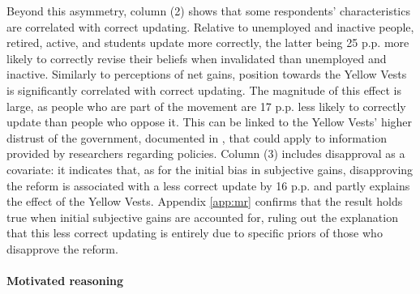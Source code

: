 \documentclass[12pt]{article} %
\begin{document}
Beyond this asymmetry, column (2) shows that some respondents' characteristics are correlated with correct updating. Relative to unemployed and inactive people, retired, active, and students update more correctly, the latter being 25 p.p. more likely to correctly revise their beliefs when invalidated than unemployed and inactive. Similarly to perceptions of net gains, position towards the Yellow Vests is significantly correlated with correct updating. The magnitude of this effect is large, as people who are part of the movement are 17 p.p. less likely to correctly update than people who oppose it. This can be linked to the Yellow Vests' higher distrust of the government, documented in \citet{algan_et_al_19}, that could apply to information provided by researchers regarding policies. Column (3) includes disapproval as a covariate: it indicates that, as for the initial bias in subjective gains, disapproving the reform is associated with a less correct update by 16 p.p. and partly explains the effect of the Yellow Vests. Appendix \ref{app:mr} confirms that the result holds true when initial subjective gains are accounted for, ruling out the explanation that this less correct updating is entirely due to specific priors of those who disapprove the reform. 

\paragraph{Motivated reasoning} %

\end{document}
